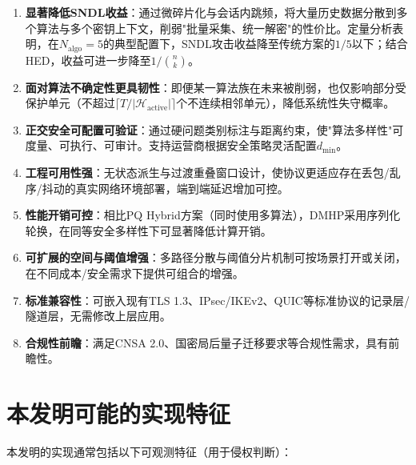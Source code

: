 ﻿\documentclass[12pt,a4paper]{article}
\begin{document}
\begin{enumerate}[label=(\arabic*)]
    \item \textbf{显著降低SNDL收益}：通过微碎片化与会话内跳频，将大量历史数据分散到多个算法与多个密钥上下文，削弱"批量采集、统一解密"的性价比。定量分析表明，在$N_{\text{algo}}=5$的典型配置下，SNDL攻击收益降至传统方案的$1/5$以下；结合HED，收益可进一步降至$1/\binom{n}{k}$。

    \item \textbf{面对算法不确定性更具韧性}：即便某一算法族在未来被削弱，也仅影响部分受保护单元（不超过$\lceil T/|\mathcal{H}_{\text{active}}| \rceil$个不连续相邻单元），降低系统性失守概率。

    \item \textbf{正交安全可配置可验证}：通过硬问题类别标注与距离约束，使"算法多样性"可度量、可执行、可审计。支持运营商根据安全策略灵活配置$d_{\min}$。

    \item \textbf{工程可用性强}：无状态派生与过渡重叠窗口设计，使协议更适应存在丢包/乱序/抖动的真实网络环境部署，端到端延迟增加可控。

    \item \textbf{性能开销可控}：相比PQ Hybrid方案（同时使用多算法），DMHP采用序列化轮换，在同等安全多样性下可显著降低计算开销。

    \item \textbf{可扩展的空间与阈值增强}：多路径分散与阈值分片机制可按场景打开或关闭，在不同成本/安全需求下提供可组合的增强。

    \item \textbf{标准兼容性}：可嵌入现有TLS 1.3、IPsec/IKEv2、QUIC等标准协议的记录层/隧道层，无需修改上层应用。

    \item \textbf{合规性前瞻}：满足CNSA 2.0、国密局后量子迁移要求等合规性需求，具有前瞻性。
\end{enumerate}

\section{本发明可能的实现特征}

本发明的实现通常包括以下可观测特征（用于侵权判断）：
\end{document}
